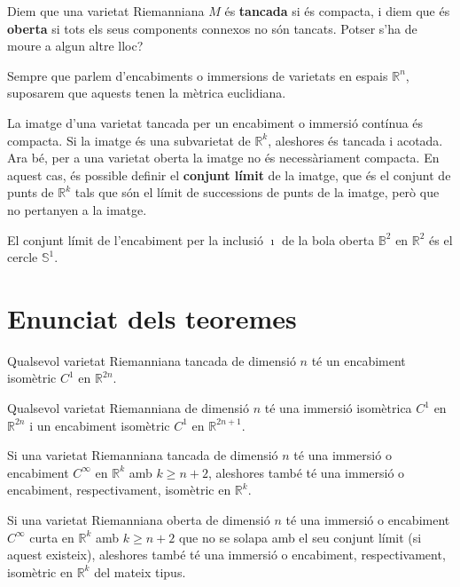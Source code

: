 \begin{defi}
    Diem que una varietat Riemanniana $M$ és \textbf{tancada} si és compacta, i diem que és \textbf{oberta} si tots els seus components connexos no són tancats. {\color{blue} Potser s'ha de moure a algun altre lloc?}
\end{defi}

\begin{nota}
    Sempre que parlem d'encabiments o immersions de varietats en espais $\mathbb R^n$, suposarem que aquests tenen la mètrica euclidiana.
\end{nota}

La imatge d'una varietat tancada per un encabiment o immersió contínua és compacta. Si la imatge és una subvarietat de $\mathbb R^k$, aleshores és tancada i acotada. Ara bé, per a una varietat oberta la imatge no és necessàriament compacta. En aquest cas, és possible definir el \textbf{conjunt límit} de la imatge, que és el conjunt de punts de $\mathbb R^k$ tals que són el límit de successions de punts de la imatge, però que no pertanyen a la imatge. 

\begin{ex}
    El conjunt límit de l'encabiment per la inclusió $\imath$ de la bola oberta $\mathbb B^2$ en $\mathbb R^2$ és el cercle $\mathbb S^1$.
\end{ex}

\section{Enunciat dels teoremes}

\begin{teo}
    Qualsevol varietat Riemanniana tancada de dimensió $n$ té un encabiment isomètric $C^1$ en $\mathbb R^{2n}$.
\end{teo}
\begin{teo}
    Qualsevol varietat Riemanniana de dimensió $n$ té una immersió isomètrica $C^1$ en $\mathbb R^{2n}$ i un encabiment isomètric $C^1$ en $\mathbb R^{2n+1}$.
\end{teo}
\begin{teo}
    Si una varietat Riemanniana tancada de dimensió $n$ té una immersió o encabiment $C^\infty$ en $\mathbb R^{k}$ amb $k\ge n+2$, aleshores també té una immersió o encabiment, respectivament, isomètric en $\mathbb R^{k}$.
\end{teo}
\begin{teo}
    Si una varietat Riemanniana oberta de dimensió $n$ té una immersió o encabiment $C^\infty$ curta en $\mathbb R^{k}$ amb $k\ge n+2$ que no se solapa amb el seu conjunt límit (si aquest existeix), aleshores també té una immersió o encabiment, respectivament, isomètric en $\mathbb R^{k}$ del mateix tipus.
\end{teo}
